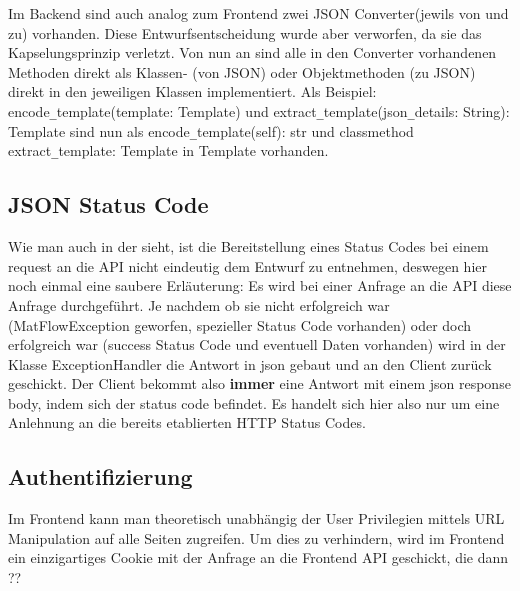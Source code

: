         \vspace{0.3in}
        Im Backend sind auch analog zum Frontend zwei JSON Converter(jewils von und zu) vorhanden.
        Diese Entwurfsentscheidung wurde aber verworfen, da sie das Kapselungsprinzip verletzt.
        Von nun an sind alle in den Converter vorhandenen Methoden direkt als Klassen- (von JSON)
        oder Objektmethoden (zu JSON) direkt in den jeweiligen Klassen implementiert. Als Beispiel: 
        encode\texttt{\_}template(template: Template) und extract\texttt{\_}template(json\texttt{\_}details: String): Template
        sind nun als encode\texttt{\_}template(self): str und \texttt{\@}classmethod extract\texttt{\_}template: Template 
        in Template vorhanden.    


\subsection{JSON Status Code}
Wie man auch in der  sieht, ist die Bereitstellung eines Status Codes bei einem request an die API nicht eindeutig
dem Entwurf zu entnehmen, deswegen hier noch einmal eine saubere Erläuterung:
Es wird bei einer Anfrage an die API diese Anfrage durchgeführt. Je nachdem ob sie nicht erfolgreich war (MatFlowException 
geworfen, spezieller Status Code vorhanden) oder doch erfolgreich war (success Status Code und eventuell Daten vorhanden) 
wird in der Klasse ExceptionHandler die Antwort in json gebaut und an den Client zurück geschickt. 
Der Client bekommt also \textbf{immer} eine Antwort mit einem json response body, indem sich der status code befindet. 
Es handelt sich hier also nur um eine Anlehnung an die bereits etablierten HTTP Status Codes.

\subsection{Authentifizierung} \label{Cookie}
Im Frontend kann man theoretisch unabhängig der User Privilegien mittels URL Manipulation auf alle 
Seiten zugreifen. Um dies zu verhindern, wird im Frontend ein einzigartiges Cookie mit der Anfrage an die Frontend
API geschickt, die dann ??



